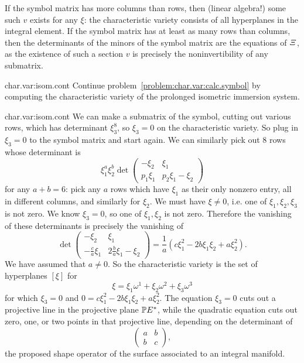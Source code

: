 If the symbol matrix has more columns than rows, then (linear algebra!) some such \(v\) exists for any \(\xi\): the characteristic variety consists of all hyperplanes in the integral element.
If the symbol matrix has at least as many rows than columns, then the determinants of the minors of the symbol matrix are the equations of \(\CV\), as the existence of such a section \(v\) is precisely the noninvertibility of any submatrix.
\begin{problem}{char.var:isom.cont}
Continue problem~\vref{problem:char.var:calc.symbol} by computing the characteristic variety of the prolonged isometric immersion system.
\end{problem}
\begin{answer}{char.var:isom.cont}
We can make a submatrix of the symbol, cutting out various rows, which has determinant \(\xi_3^8\), so \(\xi_3=0\) on the characteristic variety.
So plug in \(\xi_3=0\) to the symbol matrix and start again.
We can similarly pick out \(8\) rows whose determinant is
\[
\xi_1^a\xi_2^b
\det
\begin{pmatrix}
-\xi_2&\xi_1\\
p_1\xi_1&p_2\xi_1-\xi_2
\end{pmatrix}
\]
for any \(a+b=6\): pick any \(a\) rows which have \(\xi_1\) as their only nonzero entry, all in different columns, and similarly for \(\xi_2\).
We must have \(\xi\ne 0\), i.e. one of \(\xi_1,\xi_2,\xi_3\) is not zero.
We know \(\xi_3=0\), so one of \(\xi_1,\xi_2\) is not zero.
Therefore the vanishing of these determinants is precisely the vanishing of
\[
\det
\begin{pmatrix}
-\xi_2&\xi_1\\
-\frac{c}{a}\xi_1&2\frac{b}{a}\xi_1-\xi_2
\end{pmatrix}
=
\frac{1}{a}(c\xi_1^2-2b\xi_1\xi_2+a\xi_2^2).
\]
We have assumed that \(a\ne 0\).
So the characteristic variety is the set of hyperplanes \([\xi]\) for
\[
\xi=\xi_1\omega^1+\xi_2\omega^2+\xi_3\omega^3
\]
for which \(\xi_3=0\) and \(0=c\xi_1^2-2b\xi_1\xi_2+a\xi_2^2\).
The equation \(\xi_3=0\) cuts out a projective line in the projective plane \(\Proj(E^*)\), while the quadratic equation cuts out zero, one, or two points in that projective line, depending on the determinant of 
\[
\begin{pmatrix}
a&b\\
b&c
\end{pmatrix},
\]
the proposed shape operator of the surface associated to an integral manifold.
\end{answer}
